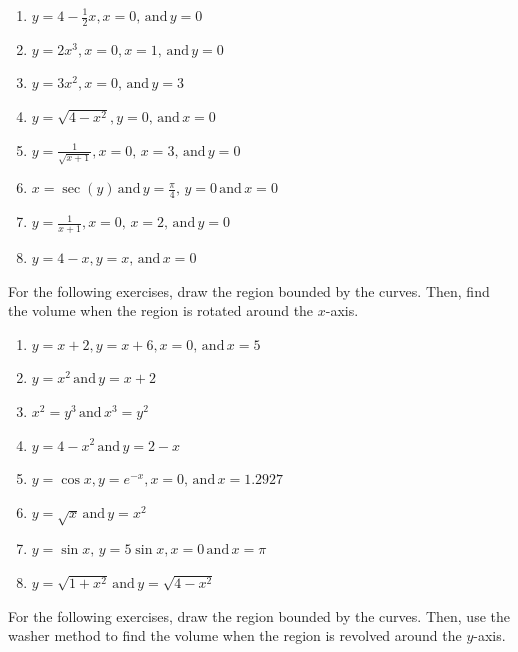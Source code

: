 \documentclass{exercises}
\begin{document}
\begin{enumerate}[resume]
\item $y=4-\frac{1}{2}x,x=0,\,\text{and}\,y=0$
\item $y=2x^{3},x=0,x=1,\,\text{and}\,y=0$
\item $y=3x^{2},x=0,\,\text{and}\,y=3$
\item $y=\sqrt{4-x^{2}},y=0,\,\text{and}\,x=0$
\item $y=\frac{1}{\sqrt{x+1}},x=0,\,x=3,\,\text{and}\,y=0$
\item $x=\sec(y)\,\text{and}\,y=\frac{\pi}{4},\,y=0\,\text{and}\,x=0$
\item $y=\frac{1}{x+1},x=0,\,x=2,\,\text{and}\,y=0$
\item $y=4-x,y=x,\,\text{and}\,x=0$
\end{enumerate}

For the following exercises, draw the region bounded by the curves. Then, find the volume when the region is rotated around the $x$-axis.

\begin{enumerate}[resume]
\item $y=x+2,y=x+6,x=0,\,\text{and}\,x=5$
\item $y=x^{2}\,\text{and}\,y=x+2$
\item $x^{2}=y^{3}\,\text{and}\,x^{3}=y^{2}$
\item $y=4-x^{2}\,\text{and}\,y=2-x$
\item \techrequired $y=\cos x,y=e^{-x},x=0,\,\text{and}\,x=1.2927$
\item $y=\sqrt{x}\,\text{and}\,y=x^{2}$
\item $y=\sin x,\,y=5\sin x,x=0\,\text{and}\,x=\pi$
\item $y=\sqrt{1+x^{2}}\,\text{and}\,y=\sqrt{4-x^{2}}$
\end{enumerate}

For the following exercises, draw the region bounded by the curves. Then, use the washer method to find the volume when the region is revolved around the $y$-axis.
\end{document}
